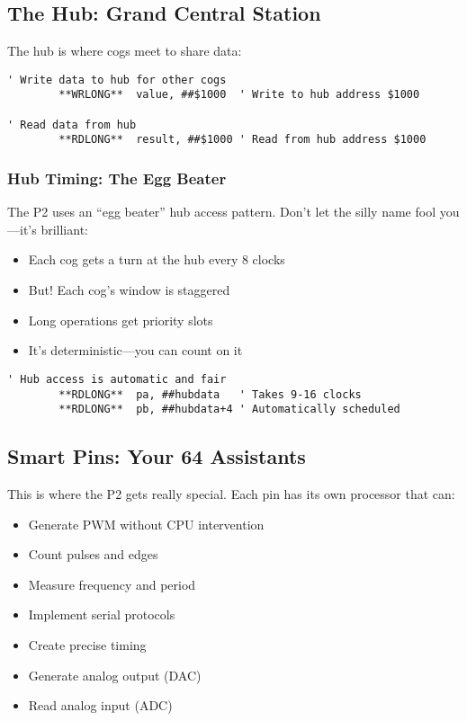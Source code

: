 \documentclass[11pt]{book}
\providecommand{\tightlist}{%
  \setlength{\itemsep}{0pt}\setlength{\parskip}{0pt}}
\begin{document}
\hypertarget{the-hub-grand-central-station}{%
\subsection{The Hub: Grand Central
Station}\label{the-hub-grand-central-station}}

The hub is where cogs meet to share data:

\begin{lstlisting}
' Write data to hub for other cogs
        **WRLONG**  value, ##$1000  ' Write to hub address $1000
        
' Read data from hub
        **RDLONG**  result, ##$1000 ' Read from hub address $1000
\end{lstlisting}

\hypertarget{hub-timing-the-egg-beater}{%
\subsubsection{Hub Timing: The Egg
Beater}\label{hub-timing-the-egg-beater}}

The P2 uses an ``egg beater'' hub access pattern. Don't let the silly
name fool you---it's brilliant:

\begin{itemize}
\tightlist
\item
  Each cog gets a turn at the hub every 8 clocks
\item
  But! Each cog's window is staggered
\item
  Long operations get priority slots
\item
  It's deterministic---you can count on it
\end{itemize}

\begin{lstlisting}
' Hub access is automatic and fair
        **RDLONG**  pa, ##hubdata   ' Takes 9-16 clocks
        **RDLONG**  pb, ##hubdata+4 ' Automatically scheduled
\end{lstlisting}

\hypertarget{smart-pins-your-64-assistants}{%
\subsection{Smart Pins: Your 64
Assistants}\label{smart-pins-your-64-assistants}}

This is where the P2 gets really special. Each pin has its own processor
that can:

\begin{itemize}
\tightlist
\item
  Generate PWM without CPU intervention
\item
  Count pulses and edges
\item
  Measure frequency and period
\item
  Implement serial protocols
\item
  Create precise timing
\item
  Generate analog output (DAC)
\item
  Read analog input (ADC)
\end{itemize}
\end{document}
